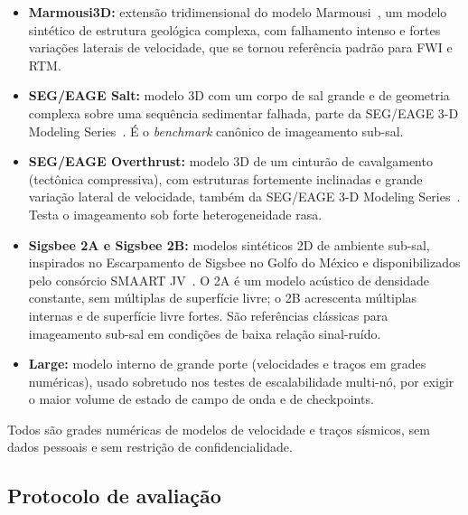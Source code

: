 \documentclass[12pt,a4paper]{article}
\begin{document}
\begin{itemize}
  \item \textbf{Marmousi3D:} extensão tridimensional do modelo
        Marmousi~\cite{versteeg1994marmousi}, um modelo sintético de
        estrutura geológica complexa, com falhamento intenso e fortes
        variações laterais de velocidade, que se tornou referência padrão
        para FWI e RTM.
  \item \textbf{SEG/EAGE Salt:} modelo 3D com um corpo de sal grande e de
        geometria complexa sobre uma sequência sedimentar falhada, parte da
        SEG/EAGE 3-D Modeling Series~\cite{aminzadeh1997segeage}. É o
        \emph{benchmark} canônico de imageamento sub-sal.
  \item \textbf{SEG/EAGE Overthrust:} modelo 3D de um cinturão de
        cavalgamento (tectônica compressiva), com estruturas fortemente
        inclinadas e grande variação lateral de velocidade, também da
        SEG/EAGE 3-D Modeling Series~\cite{aminzadeh1997segeage}. Testa o
        imageamento sob forte heterogeneidade rasa.
  \item \textbf{Sigsbee 2A e Sigsbee 2B:} modelos sintéticos 2D de ambiente
        sub-sal, inspirados no Escarpamento de Sigsbee no Golfo do México e
        disponibilizados pelo consórcio SMAART JV~\cite{paffenholz2002sigsbee}.
        O 2A é um modelo acústico de densidade constante, sem múltiplas de
        superfície livre; o 2B acrescenta múltiplas internas e de superfície
        livre fortes. São referências clássicas para imageamento sub-sal em
        condições de baixa relação sinal-ruído.
  \item \textbf{Large:} modelo interno de grande porte (velocidades e traços
        em grades numéricas), usado sobretudo nos testes de escalabilidade
        multi-nó, por exigir o maior volume de estado de campo de onda e de
        checkpoints.
\end{itemize}

Todos são grades numéricas de modelos de velocidade e traços sísmicos, sem
dados pessoais e sem restrição de confidencialidade.

\subsection{Protocolo de avaliação}
\end{document}
